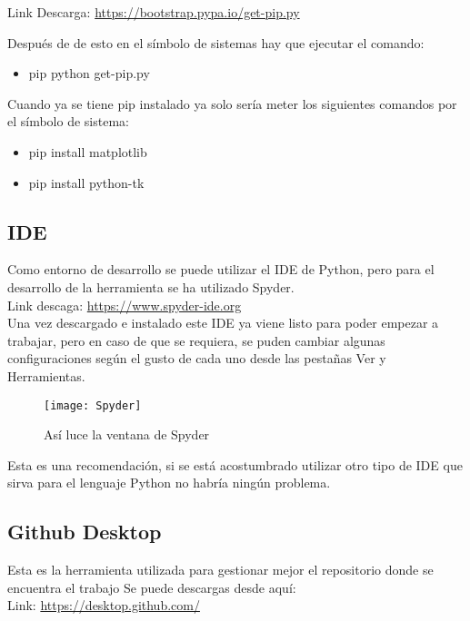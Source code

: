 Link Descarga: \url{https://bootstrap.pypa.io/get-pip.py}

Después de de esto en el símbolo de sistemas hay que ejecutar el comando: 
\begin{itemize}
	\item pip python get-pip.py
\end{itemize}

Cuando ya se tiene pip instalado ya solo sería meter los siguientes comandos por el símbolo de sistema:\\
\begin{itemize}
	\item pip install matplotlib
	\item pip install python-tk
\end{itemize}


\subsection{IDE}
Como entorno de desarrollo se puede utilizar el IDE de Python, pero para el desarrollo de la herramienta se ha utilizado Spyder. \\

Link descaga: \url{https://www.spyder-ide.org}\\

Una vez descargado e instalado este IDE ya viene listo para poder empezar a trabajar, pero en caso de que se requiera, se puden cambiar algunas configuraciones según el gusto de cada uno desde las pestañas Ver y Herramientas.\\

\begin{figure}[H]
\centering
\texttt{[image: Spyder]}
\caption{Así luce la ventana de Spyder}
\end{figure}

Esta es una recomendación, si se está acostumbrado utilizar otro tipo de IDE que sirva para el lenguaje Python no habría ningún problema.\\

\subsection{Github Desktop}

Esta es la herramienta utilizada para gestionar mejor el repositorio donde se encuentra el trabajo
Se puede descargas desde aquí: \\

Link: \url{https://desktop.github.com/}\\

